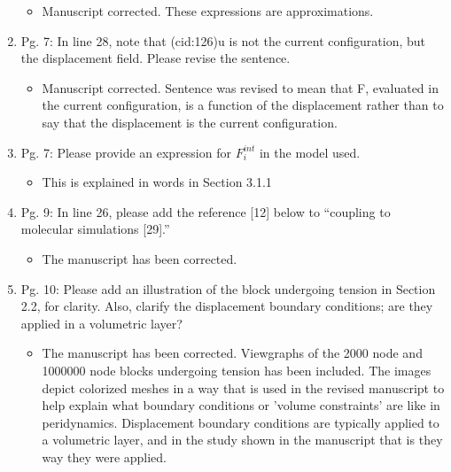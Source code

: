 \documentclass{article}
\begin{document}
\begin{enumerate}
{\color{red}  
\begin{itemize}
     \item
         Manuscript corrected. These expressions are approximations.
  \end{itemize}}

\item
Pg. 7: In line 28, note that (cid:126)u is not the current conﬁguration, but the displacement
field. Please revise the sentence.

{\color{red}  
\begin{itemize}
    \item
        Manuscript corrected. Sentence was revised to mean that F, evaluated in the current configuration, is a function of the displacement rather than to say that the displacement is the current configuration.
        \end{itemize}}

\item
Pg. 7: Please provide an expression for $F^{int}_i$ in the model used.

{\color{red}  
\begin{itemize}
    \item This is explained in words in Section 3.1.1
  \end{itemize}}

\item
Pg. 9: In line 26, please add the reference [12] below to ``coupling to molecular
simulations [29].''

{\color{red}  
\begin{itemize}
    \item
        The manuscript has been corrected.
  \end{itemize}}

\item
Pg. 10: Please add an illustration of the block undergoing tension in Section 2.2,
for clarity. Also, clarify the displacement boundary conditions; are they applied in a
volumetric layer?

{\color{red}  
\begin{itemize}
    \item
        The manuscript has been corrected. Viewgraphs of the 2000 node and 1000000 node blocks undergoing tension has been included. The images depict colorized meshes in a way that is used in the revised manuscript to help explain what boundary conditions or 'volume constraints' are like in peridynamics. Displacement boundary conditions are typically applied to a volumetric layer, and in the study shown in the manuscript that is they way they were applied.
  \end{itemize}}


\end{enumerate}
\end{document}
